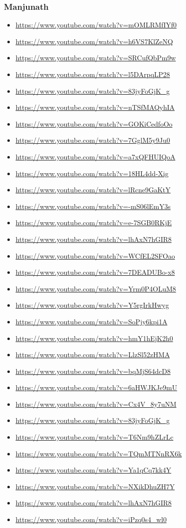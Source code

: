 \subsubsection{Manjunath}
\label{sec:org9b12d33}
\begin{itemize}
\item \url{https://www.youtube.com/watch?v=mOMLRMfIYf0}
\item \url{https://www.youtube.com/watch?v=h6VS7KlZeNQ}
\item \url{https://www.youtube.com/watch?v=SRCufQbPm9w}
\item \url{https://www.youtube.com/watch?v=l5DArpqLP28}
\item \url{https://www.youtube.com/watch?v=83jyFoGjK\_g}
\item \url{https://www.youtube.com/watch?v=nTSfMAQyhIA}
\item \url{https://www.youtube.com/watch?v=GOKiCedfoOo}
\item \url{https://www.youtube.com/watch?v=7GglM5y9Ju0}
\item \url{https://www.youtube.com/watch?v=a7xQFHUIQoA}
\item \url{https://www.youtube.com/watch?v=18HL4dd-Xig}
\item \url{https://www.youtube.com/watch?v=lRcne9GaKtY}
\item \url{https://www.youtube.com/watch?v=-mS06lEmY3s}
\item \url{https://www.youtube.com/watch?v=e-7SGB0RKjE}
\item \url{https://www.youtube.com/watch?v=lhAxN7hGIR8}
\item \url{https://www.youtube.com/watch?v=WCfEL2SFOao}
\item \url{https://www.youtube.com/watch?v=7DEADUBo-x8}
\item \url{https://www.youtube.com/watch?v=Yrm0P4OLuM8}
\item \url{https://www.youtube.com/watch?v=Y5rgIrkHwyg}
\item \url{https://www.youtube.com/watch?v=SoPjy6kpi1A}
\item \url{https://www.youtube.com/watch?v=hmY1hEjK2h0}
\item \url{https://www.youtube.com/watch?v=LlzSl52zHMA}
\item \url{https://www.youtube.com/watch?v=bqMjS64dcD8}
\item \url{https://www.youtube.com/watch?v=6aHWJKJe9mU}
\item \url{https://www.youtube.com/watch?v=Cx4V\_8y7uNM}
\item \url{https://www.youtube.com/watch?v=83jyFoGjK\_g}
\item \url{https://www.youtube.com/watch?v=T6Nm9hZLrLc}
\item \url{https://www.youtube.com/watch?v=TQmMTNnRX6k}
\item \url{https://www.youtube.com/watch?v=Ya1qCq7kk4Y}
\item \url{https://www.youtube.com/watch?v=NXikDhuZH7Y}
\item \url{https://www.youtube.com/watch?v=lhAxN7hGIR8}
\item \url{https://www.youtube.com/watch?v=iPzq0s4\_wl0}
\end{itemize}

